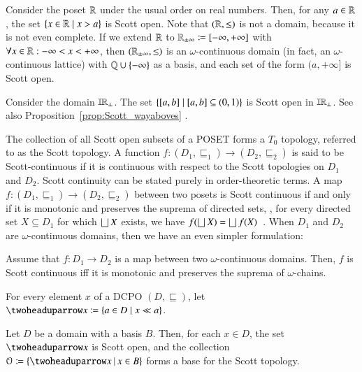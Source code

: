 \documentclass[11pt,times]{article}
\begin{document}
  \begin{example}
    Consider the poset $\R$ under the usual order on real
    numbers. Then, for any $a \in \R$, the set
    $\setbarNormal{x \in \R}{x > a}$ is Scott open. Note that
    $(\R, \leq)$ is not a domain, because it is not even complete. If
    we extend $\R$ to $\R_{\pm \infty} \defeq [-\infty, +\infty]$ with
    $\forall x \in \R: -\infty < x < +\infty$, then
    $(\R_{\pm \infty}, \leq)$ is an $\omega$-continuous domain (in
    fact, an $\omega$-continuous lattice) with $\Q \cup \set{-\infty}$
    as a basis, and each set of the form $(a,+\infty]$ is Scott open.
  \end{example}

  \begin{example}
    Consider the domain $\intvaldom[\R\lift]$. The set
    $\setbarNormal{[a,b]}{[a,b] \subseteq (0,1)}$ is Scott open in
    $\intvaldom[\R\lift]$. See also
    Proposition~\ref{prop:Scott_wayaboves}
    .
  \end{example}


The collection of all Scott open subsets of a \ac{POSET} forms a $T_0$
topology, referred to as the Scott topology. A function
$f: (D_1, \sqsubseteq_1) \to (D_2, \sqsubseteq_2)$ is said to be
Scott-continuous if it is continuous with respect to the Scott
topologies on $D_1$ and $D_2$. Scott continuity can be stated purely
in order-theoretic terms. A map
$f: (D_1, \sqsubseteq_1) \to (D_2, \sqsubseteq_2)$ between two posets
is Scott continuous if and only if it is monotonic and preserves the
suprema of directed sets, {\ie}, for every directed set
$X \subseteq D_1$ for which $\lub X$ exists, we have
$f(\lub X) = \lub
f(X)$~\parencite[Proposition~4.3.5]{Goubault-Larrecq:Non_Hausdorff_topology:2013}. When
$D_1$ and $D_2$ are $\omega$-continuous domains, then we have an even
simpler formulation:

  \begin{proposition}
    \label{prop:Scott_w_cont}
    Assume that $f: D_1 \to D_2$ is
    a map between two $\omega$-continuous domains. Then, $f$ is Scott
    continuous iff it is monotonic and preserves the suprema of
    $\omega$-chains.
  \end{proposition}

 
  For every element $x$ of a \ac{DCPO} $(D, \sqsubseteq)$, let
  $\wayaboves{x} \defeq \setbarNormal{a \in D}{x \ll a}$.
%
  \begin{proposition}
    \label{prop:Scott_wayaboves}
    Let $D$ be a domain with a basis $B$. Then, for each $x \in D$,
    the set $\wayaboves{x}$ is Scott open, and the collection
    ${\mathcal{O}} \defeq \setbarTall{\wayaboves{x}}{x \in B}$ forms a
    base for the Scott topology.
  \end{proposition}
\end{document}
